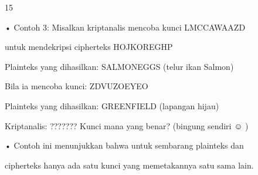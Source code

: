 \documentclass{article}
\begin{document}

15

• Contoh 3: Misalkan kriptanalis mencoba kunci  LMCCAWAAZD

   untuk mendekripsi cipherteks  HOJKOREGHP

 Plainteks yang dihasilkan: SALMONEGGS    (telur ikan Salmon)

   Bila ia mencoba kunci: ZDVUZOEYEO

 Plainteks yang dihasilkan: GREENFIELD    (lapangan hijau)

 Kriptanalis: ???????   Kunci mana yang benar? (bingung sendiri ☺ )

• Contoh ini menunjukkan bahwa untuk sembarang plainteks dan 

cipherteks hanya ada satu kunci yang memetakannya satu sama lain.
\end{document}
